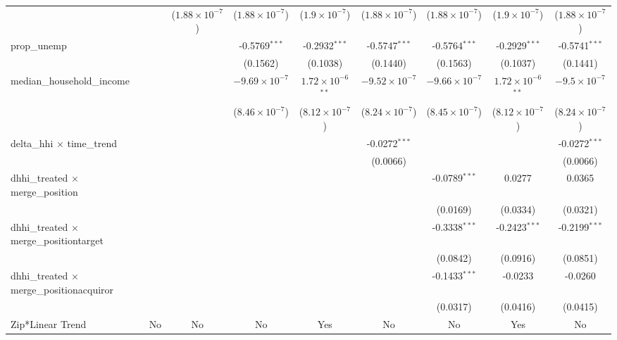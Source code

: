 \begin{table}[H]
{\begin{tabular}{lcccccccc}
   &   & ($1.88\times 10^{-7}$) & ($1.88\times 10^{-7}$) & ($1.9\times 10^{-7}$) & ($1.88\times 10^{-7}$) & ($1.88\times 10^{-7}$) & ($1.9\times 10^{-7}$) & ($1.88\times 10^{-7}$)\\ 

 prop\_unemp&   &    & -0.5769$^{***}$ & -0.2932$^{***}$ & -0.5747$^{***}$ & -0.5764$^{***}$ & -0.2929$^{***}$ & -0.5741$^{***}$\\ 

   &   &    & (0.1562) & (0.1038) & (0.1440) & (0.1563) & (0.1037) & (0.1441)\\ 

 median\_household\_income&   &    & $-9.69\times 10^{-7}$ & $1.72\times 10^{-6}$$^{**}$ & $-9.52\times 10^{-7}$ & $-9.66\times 10^{-7}$ & $1.72\times 10^{-6}$$^{**}$ & $-9.5\times 10^{-7}$\\ 

   &   &    & ($8.46\times 10^{-7}$) & ($8.12\times 10^{-7}$) & ($8.24\times 10^{-7}$) & ($8.45\times 10^{-7}$) & ($8.12\times 10^{-7}$) & ($8.24\times 10^{-7}$)\\ 

 delta\_hhi $\times $ time\_trend&   &    &    &    & -0.0272$^{***}$ &    &    & -0.0272$^{***}$\\ 

   &   &    &    &    & (0.0066) &    &    & (0.0066)\\ 

 dhhi\_treated $\times $ merge\_position&   &    &    &    &    & -0.0789$^{***}$ & 0.0277 & 0.0365\\ 

   &   &    &    &    &    & (0.0169) & (0.0334) & (0.0321)\\ 

 dhhi\_treated $\times $ merge\_positiontarget&   &    &    &    &    & -0.3338$^{***}$ & -0.2423$^{***}$ & -0.2199$^{***}$\\ 

   &   &    &    &    &    & (0.0842) & (0.0916) & (0.0851)\\ 

 dhhi\_treated $\times $ merge\_positionacquiror&   &    &    &    &    & -0.1433$^{***}$ & -0.0233 & -0.0260\\ 

   &   &    &    &    &    & (0.0317) & (0.0416) & (0.0415)\\ 

 Zip*Linear Trend & No & No & No & Yes & No & No & Yes & No\\ 


\end{tabular}}
\end{table}
